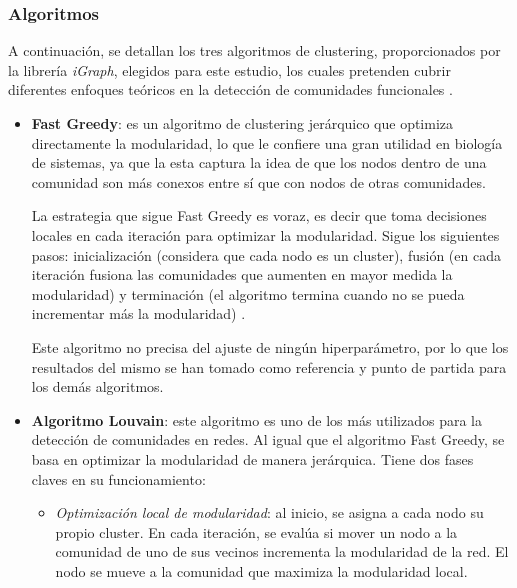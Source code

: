 \subsubsection{Algoritmos}
\label{sec:algoritmos}

A continuación, se detallan los tres algoritmos de clustering, proporcionados por la librería \textit{iGraph}, elegidos para este estudio, los cuales pretenden cubrir diferentes enfoques teóricos en la detección de comunidades funcionales \cite{igraph}.  

\begin{itemize}
    \item \textbf{Fast Greedy}: es un algoritmo de clustering jerárquico que optimiza directamente la modularidad, lo que le confiere una gran utilidad en biología de sistemas, ya que la esta captura la idea de que los nodos dentro de una comunidad son más conexos entre sí que con nodos de otras comunidades.
    
    La estrategia que sigue Fast Greedy es voraz, es decir que toma decisiones locales en cada iteración para optimizar la modularidad. Sigue los siguientes pasos: inicialización (considera que cada nodo es un cluster), fusión (en cada iteración fusiona las comunidades que aumenten en mayor medida la modularidad) y terminación (el algoritmo termina cuando no se pueda incrementar más la modularidad) \cite{clauset2004finding}.

    Este algoritmo no precisa del ajuste de ningún hiperparámetro, por lo que los resultados del mismo se han tomado como referencia y punto de partida para los demás algoritmos.
    
    
    \item \textbf{Algoritmo Louvain}: este algoritmo es uno de los más utilizados para la detección de comunidades en redes. Al igual que el algoritmo Fast Greedy, se basa en optimizar la modularidad de manera jerárquica. Tiene dos fases claves en su funcionamiento:

    \begin{itemize}
        \item \textit{Optimización local de modularidad}: al inicio, se asigna a cada nodo su propio cluster. En cada iteración, se evalúa si mover un nodo a la comunidad de uno de sus vecinos incrementa la modularidad de la red. El nodo se mueve a la comunidad que maximiza la modularidad local.


\end{itemize}
\end{itemize}
